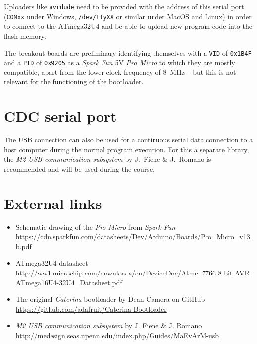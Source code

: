 \begin{multicols}{2}
  Uploaders like \lstinline!avrdude! need to be provided with the address of
  this serial port (\lstinline!COMxx! under Windows, \lstinline!/dev/ttyXX! or similar under
  MacOS and Linux) in order to connect to the ATmega32U4 and be able to upload new program code
  into the flash memory.

  The breakout boards are preliminary identifying themselves with a \lstinline!VID! of \lstinline!0x1B4F!
  and a \lstinline!PID! of \lstinline!0x9205! as a \emph{Spark Fun} 5V \emph{Pro Micro} to which
  they are mostly compatible,
  apart from the lower clock frequency of \SI{8}{\mega\hertz} -- but this is not relevant for the
  functioning of the bootloader.


\section{CDC serial port}
  The USB connection can also be used for a continuous serial data connection to a host computer
  during the normal program execution. For this a separate library, the \emph{M2 USB communication subsystem} by
  J.\ Fiene \& J.\ Romano is recommended and will be used during the course.
\end{multicols}

\section*{External links}
\begin{itemize}
  \item Schematic drawing of the \emph{Pro Micro} from \emph{Spark Fun}\\ \url{https://cdn.sparkfun.com/datasheets/Dev/Arduino/Boards/Pro_Micro_v13b.pdf}
  \item ATmega32U4 datasheet\\ \url{http://ww1.microchip.com/downloads/en/DeviceDoc/Atmel-7766-8-bit-AVR-ATmega16U4-32U4_Datasheet.pdf}
  \item The original \emph{Caterina} bootloader by Dean Camera on GitHub\\
      \url{https://github.com/adafruit/Caterina-Bootloader}
  \item \emph{M2 USB communication subsystem} by J. Fiene \& J. Romano\\
  \url{http://medesign.seas.upenn.edu/index.php/Guides/MaEvArM-usb}
\end{itemize}




